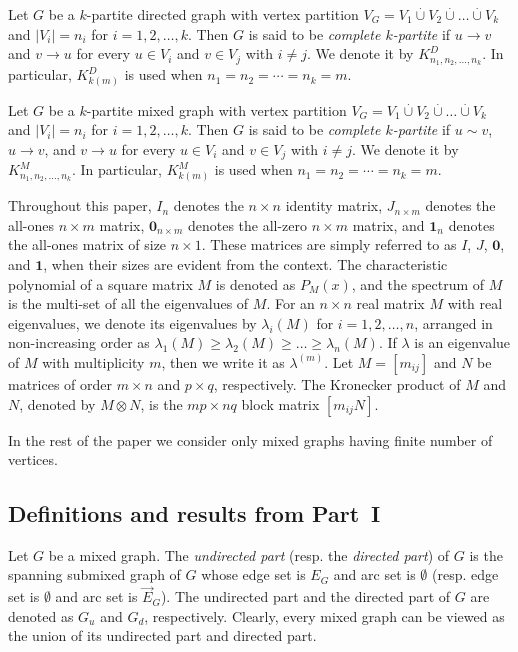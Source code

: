 \documentclass[12pt]{article}
\numberwithin{equation}{section}
\begin{document}
Let $G$ be a $k$-partite directed graph with vertex partition $V_G=V_1\overset{.}{\cup}V_2\overset{.}{\cup}\ldots\overset{.}{\cup}V_k$ and $|V_i|=n_i$ for $i=1,2,\ldots,k$. Then $G$ is said to be \textit{complete $k$-partite} if $u\rightarrow v$ and $v\rightarrow u$ for every $u\in V_i$ and $v\in V_j$ with $i\neq j$. We denote it by $K^D_{n_1,n_2,\ldots,n_k}$. In particular, $K^D_{k(m)}$ is used when $n_1=n_2=\cdots=n_k=m$.

Let $G$ be a $k$-partite mixed graph with vertex partition $V_G=V_1\overset{.}{\cup}V_2\overset{.}{\cup}\ldots\overset{.}{\cup}V_k$ and $|V_i|=n_i$ for $i=1,2,\ldots,k$. Then $G$ is said to be \textit{complete $k$-partite} if $u\sim v$,  $u\rightarrow v$, and $v\rightarrow u$ for every $u\in V_i$ and $v\in V_j$ with $i\neq j$. We denote it by $K^M_{n_1,n_2,\ldots,n_k}$. In particular, $K^M_{k(m)}$ is used when $n_1=n_2=\cdots=n_k=m$.

Throughout this paper, $I_n$ denotes the $n\times n$ identity matrix, $J_{n\times m}$ denotes the all-ones $n\times m$ matrix, $\mathbf{0}_{n\times m}$ denotes the all-zero $n\times m$ matrix, and $\mathbf{1}_n$ denotes the all-ones matrix of size $n\times 1$. These matrices are simply referred to as $I$, $J$, $\mathbf{0}$, and $\mathbf{1}$, when their sizes are evident from the context. The characteristic polynomial of a square matrix  $M$ is denoted as $P_M(x)$, and the spectrum of $M$ is the multi-set of all the eigenvalues of $M$. For an $ n \times n$ real matrix $ M $ with real eigenvalues, we denote its eigenvalues by $ \lambda_i(M) $ for $ i = 1,2,\dots,n $, arranged in non-increasing order as $ \lambda_1(M) \geq \lambda_2(M) \geq \dots \geq \lambda_n(M) $. If $\lambda$ is an eigenvalue of $M$ with multiplicity $m$, then we write it as $\lambda^{(m)}$.
Let $M=[m_{ij}]$ and $N$ be matrices of order $m\times n$ and $p\times q$, respectively. The Kronecker product of $M$ and $N$, denoted by $M\otimes N$, is the $mp\times nq$ block matrix $[m_{ij}N]$.

In the rest of the paper we consider only mixed graphs having finite number of vertices.
		
		\subsection{{Definitions and results from Part~I}}\label{S3}
	Let $G$ be a mixed graph. The \textit{undirected part} (resp. the \textit{directed part}) of $G$ is the spanning submixed graph of $G$ whose edge set is $E_G$ and arc set is $\emptyset$ (resp. edge set is $\emptyset$ and arc set is $\vec{E}_G$). The undirected part   and the directed part of $G$ are denoted as $G_u$ and $G_d$, respectively. 
	Clearly, every mixed graph can be viewed as the union of its undirected part and directed part. 
\end{document}
